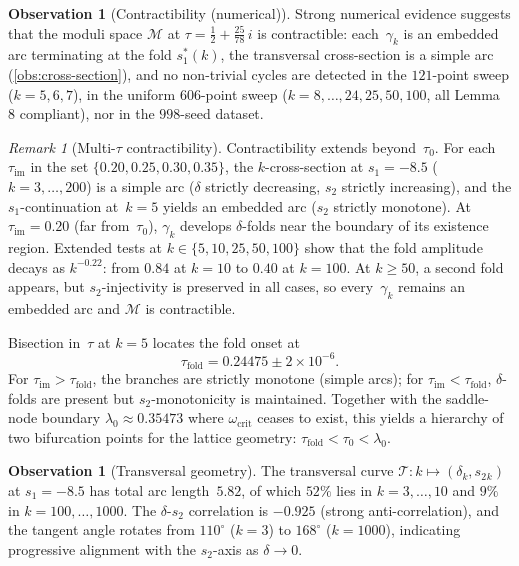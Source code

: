 \documentclass[11pt,a4paper]{article}
\theoremstyle{plain}
\theoremstyle{definition}
\newtheorem{observation}[theorem]{Observation}
\theoremstyle{remark}
\newtheorem{remark}[theorem]{Remark}
\begin{document}
\begin{observation}[Contractibility \textup{(}numerical\textup{)}]
\label{prop:contractible}
Strong numerical evidence suggests that
the moduli space $\mathcal{M}$ at
$\tau = \tfrac12 + \tfrac{25}{78}\,i$ is contractible:
each~$\gamma_k$ is an embedded arc terminating at the fold
$s_1^*(k)$, the transversal cross-section is a simple arc
(\cref{obs:cross-section}), and no non-trivial cycles are
detected in the $121$-point sweep ($k = 5,6,7$), in the
uniform $606$-point sweep ($k = 8,\ldots,24,25,50,100$, all
Lemma~$8$ compliant), nor in the $998$-seed dataset.
\end{observation}

\begin{remark}[Multi-$\tau$ contractibility]
\label{rem:multi-tau-contractibility}
Contractibility extends beyond~$\tau_0$.
For each $\tau_{\mathrm{im}}$ in the set
$\{0.20, 0.25, 0.30, 0.35\}$,
the $k$-cross-section at $s_1 = -8.5$
($k = 3, \ldots, 200$) is a simple arc
($\delta$ strictly decreasing, $s_2$ strictly increasing),
and the $s_1$-continuation at~$k=5$ yields an embedded arc
($s_2$ strictly monotone).
At $\tau_{\mathrm{im}} = 0.20$ (far from~$\tau_0$),
$\gamma_{k}$ develops $\delta$-folds near the boundary of its
existence region.  Extended tests at
$k \in \{5, 10, 25, 50, 100\}$ show that the fold amplitude
decays as $k^{-0.22}$: from $0.84$ at $k=10$ to $0.40$ at
$k=100$.  At $k \geq 50$, a second fold appears, but
$s_2$-injectivity is preserved in all cases, so
every~$\gamma_k$ remains an embedded arc and $\mathcal{M}$
is contractible.

Bisection in~$\tau$ at $k = 5$ locates the fold onset at
\[
  \tau_{\mathrm{fold}} = 0.24475 \pm 2 \times 10^{-6}.
\]
For $\tau_{\mathrm{im}} > \tau_{\mathrm{fold}}$,
the branches are strictly monotone (simple arcs); for
$\tau_{\mathrm{im}} < \tau_{\mathrm{fold}}$,
$\delta$-folds are present but $s_2$-monotonicity is
maintained.
Together with the saddle-node boundary
$\lambda_0 \approx 0.35473$ where
$\omega_{\mathrm{crit}}$ ceases to exist, this yields a
hierarchy of two bifurcation points for the lattice
geometry:
$\tau_{\mathrm{fold}} < \tau_0 < \lambda_0$.
\end{remark}

\begin{observation}[Transversal geometry]
\label{obs:transversal}
The transversal curve $\mathcal{T}\colon k \mapsto
(\delta_k, s_2{}_k)$ at $s_1 = -8.5$ has total arc
length~$5.82$, of which $52\%$ lies in $k = 3,\ldots,10$
and $9\%$ in $k = 100,\ldots,1000$.  The $\delta$-$s_2$
correlation is $-0.925$ (strong anti-correlation), and
the tangent angle rotates from $110^\circ$ ($k=3$)
to $168^\circ$ ($k=1000$), indicating progressive
alignment with the $s_2$-axis as $\delta \to 0$.
\end{observation}
\end{document}
